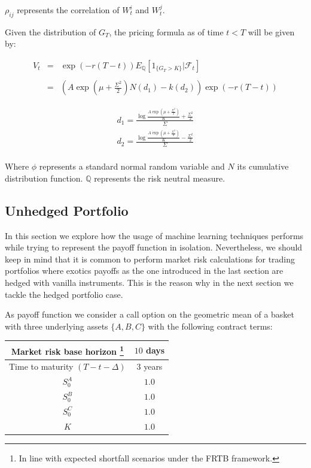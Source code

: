 $\rho_{ij}$ represents the correlation of $W_t^i$ and $W_t^j$.

Given the distribution of $G_T$, the pricing formula as of time $t<T$ will be given by:

$$
\begin{array}{lll}
V_{t}&=&\exp (-r(T-t)) E_{\mathbb{Q}}\left[1_{\{G_{T}>K\}} | \mathcal{F}_t\right] \\
&& \\
&=&\left(A\exp\left(\mu+\frac{\Sigma^2}{2}\right)N\left(d_1\right)-k\left(d_2\right)\right)\exp\left(-r(T-t)\right)
\end{array}
$$

$$
\begin{aligned}
d_1 = \frac{\log\frac{A\exp\left(\mu+\frac{\Sigma^2}{2}\right)}{K}+\frac{\Sigma^2}{2}}{\Sigma} \\
d_2 = \frac{\log\frac{A\exp\left(\mu+\frac{\Sigma^2}{2}\right)}{K}-\frac{\Sigma^2}{2}}{\Sigma} \\
\end{aligned}
$$



Where $\phi$ represents a standard normal random variable and $N$ its cumulative distribution function. $\mathbb{Q}$ represents the risk neutral measure.


\subsection{Unhedged Portfolio}
 In this section we explore how the usage of machine learning techniques performs while trying to represent the payoff function in isolation. Nevertheless, we should keep in mind that it is common to perform market risk calculations for trading portfolios where exotics payoffs as the one introduced in the last section are hedged with vanilla instruments. This is the reason why in the next section we tackle the hedged portfolio case. 
 
 As payoff function we consider a call option on the geometric mean of a basket with three underlying assets $\{A,B,C\}$ with the following contract terms:
 
 
\begin{center}
\begin{tabular}{||c | c||} 
 \hline
 Market risk base horizon \footnote{In line with expected shortfall scenarios under the FRTB\cite{FRTB} framework.} & $10$ days \\ 
 \hline
 Time to maturity $(T-t-\Delta)$ & $3$ years \\
 \hline
 $S_0^A$ & $1.0$ \\
 \hline
 $S_0^B$ & $1.0$ \\
 \hline
 $S_0^C$ & $1.0$ \\
 \hline
 $K$ & $1.0$ \\
 \hline
 \end{tabular}
\end{center}

